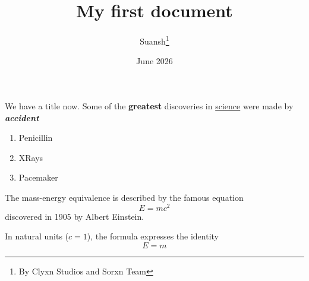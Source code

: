 \documentclass[12pt,letterpaper]{article}
\title{My first document}
\author{Suansh\thanks{By Clyxn Studios and Sorxn Team}}
\date{June 2026}
\begin{document}
	\maketitle
	We have a title now.
	Some of the \textbf{greatest} discoveries in \underline{science} were made by \textbf{\textit{accident}}
	\begin{enumerate}
		\item Penicillin
		\item XRays
		\item Pacemaker
	\end{enumerate}
	
	The mass-energy equivalence is described by the famous equation
	\[E=mc^2\] discovered in 1905 by Albert Einstein.
	
	In natural units ($c = 1$), the formula expresses the identity
	\begin{equation}
		E=m
	\end{equation}
\end{document}
